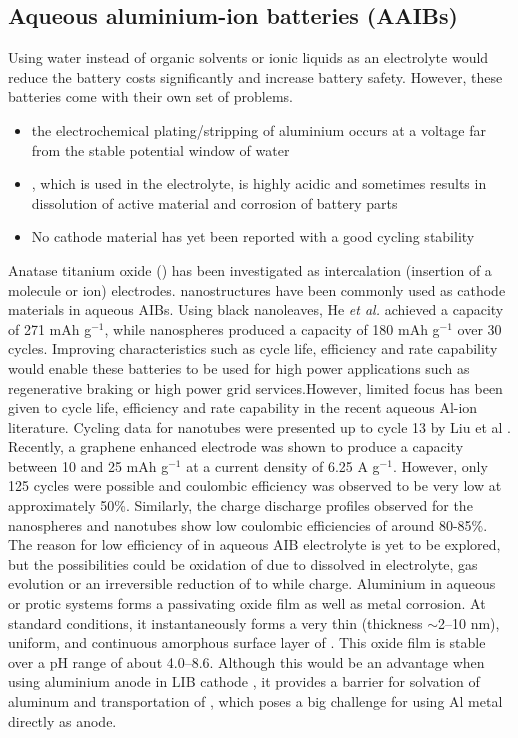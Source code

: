 {\subsection{Aqueous aluminium-ion batteries (AAIBs)}
Using water instead of organic solvents or ionic liquids as an electrolyte would reduce the battery costs significantly and increase battery safety.
However, these batteries come with their own set of problems. 
\begin{itemize}
    \item the electrochemical plating/stripping of aluminium occurs at a
    voltage far from the stable potential window of water
    \item {}, which is used in the electrolyte, is highly acidic and sometimes results in dissolution of active material and corrosion of battery parts
    \item No cathode material has yet been reported with a good cycling stability 
\end{itemize}  
Anatase titanium oxide () has been investigated as intercalation (insertion of a molecule or ion) electrodes.  nanostructures have been commonly used as cathode materials in aqueous AIBs. Using black  nanoleaves, He \textit{et al.} achieved a capacity of 271 mAh g$^{-1}$, while  nanospheres produced a capacity of 180 mAh g$^{-1}$ over 30 cycles. Improving characteristics such as cycle life, efficiency and rate capability would enable these batteries to be used for high power applications such as regenerative braking or high power grid services.However, limited focus has been given to cycle life, efficiency and rate capability in the recent aqueous Al-ion literature. Cycling data for  nanotubes were presented up to cycle 13 by Liu et al \cite{liu_aluminum_2012}.  Recently, a graphene enhanced  electrode was shown to produce a capacity between 10 and 25 mAh g$^{-1}$ at a current density of 6.25 A g$^{-1}$. However, only 125 cycles were possible and coulombic efficiency was observed to be very low at approximately 50\%. Similarly, the charge discharge profiles observed for the nanospheres and nanotubes show low coulombic efficiencies of around 80-85\%. The reason for low efficiency of  in aqueous AIB electrolyte is yet to be explored, but the possibilities could be oxidation of  due to dissolved  in electrolyte,  gas evolution or an irreversible reduction of  to  while charge.  
Aluminium in aqueous or protic systems forms a passivating oxide film as well as metal corrosion. At standard conditions, it instantaneously forms a very thin (thickness $\sim$2–10 nm), uniform, and continuous amorphous surface layer of  \cite{vargel2004translated}. This oxide film is stable over a pH range of about 4.0–8.6. Although this would be an advantage when using aluminium anode in LIB cathode \cite{myung_electrochemical_2011}, it provides a barrier for solvation of aluminum and transportation of , which poses a big challenge for using Al metal directly as anode.

}
